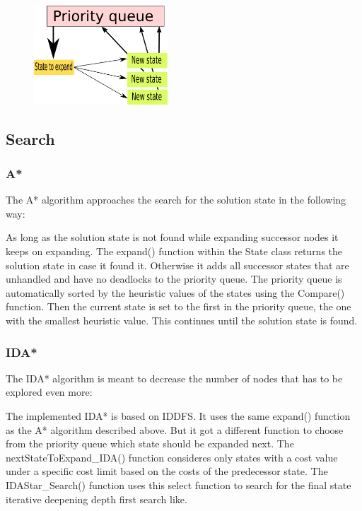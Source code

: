 \documentclass[a4paper,10pt]{article}
\begin{document}
	\begin{figure}[h]
	\centerline{\includegraphics[height=5 cm, width=5cm]{./priority_state.png}}
	\end{figure}


    \subsection{Search}
	\subsubsection{A*}
	The A* algorithm approaches the search for the solution state in the following way:

	As long as the solution state is not found while expanding successor nodes it keeps on expanding. The expand() function 	within the State class returns the solution state in case it found it. Otherwise it adds all successor states that are 		unhandled and have no deadlocks to the priority queue. The priority queue is automatically sorted by the heuristic values of 		the states using the Compare() function. Then the current state is set to the first in the priority queue, the one with the 		smallest heuristic value. This continues until the solution state is found.

	\subsubsection{IDA*}
	The IDA* algorithm is meant to decrease the number of nodes that has to be explored even more:

	The implemented IDA* is based on IDDFS. It uses the same expand() function as the A* algorithm described above. But it got a 		different function to choose from the priority queue which state should be expanded next. The nextStateToExpand_IDA() 		function consideres only states with a cost value under a specific cost limit based on the costs of the predecessor state. 		The IDAStar_Search() function uses this select function to search for the final state iterative deepening depth first search 		like.
\end{document}
